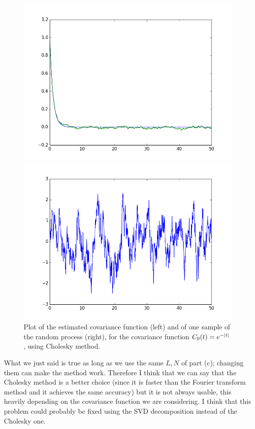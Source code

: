 \documentclass[a4paper,11pt]{article}
\theoremstyle{definition}
\theoremstyle{plain}
\theoremstyle{remark}
\DeclarePairedDelimiter{\abs}{\lvert}{\rvert}
\begin{document}
\begin{figure}[htbp]
\centering
\begin{minipage}[c]{.47\textwidth}
\includegraphics[width=\textwidth,
keepaspectratio]{ex6_C0_chol_cov.png}
\end{minipage}
\hspace{4mm}
\begin{minipage}[c]{.47\textwidth}
\includegraphics[width=\textwidth,
keepaspectratio]{ex6_C0_chol_sample.png}
\end{minipage}
\caption{ \label{figure:ex6_C0_chol} Plot of the estimated covariance function (left) and of one sample of the random process (right), for the covariance function $C_0(t) = e^{-\abs{t}}$, using Cholesky method.}
\end{figure}

What we just said is true as long as we use the same $L,N$ of part (c); changing them can make the method work. Therefore I think that we can say that the Cholesky method is a better choice (since it is faster than the Fourier transform method and it achieves the same accuracy) but it is not always usable, this heavily depending on the covariance function we are considering. I think that this problem could probably be fixed using the SVD decomposition instead 
of the Cholesky one.
\end{document}
